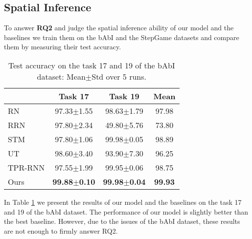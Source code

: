 \documentclass[letterpaper]{article} \usepackage{aaai22}  \usepackage{times}  \usepackage{helvet}  \usepackage{courier}  \usepackage[hyphens]{url}  \usepackage{graphicx} \urlstyle{rm} \def\UrlFont{\rm}  \usepackage{natbib}  \usepackage{caption} \DeclareCaptionStyle{ruled}{labelfont=normalfont,labelsep=colon,strut=off} \frenchspacing  \setlength{\pdfpagewidth}{8.5in}  \setlength{\pdfpageheight}{11in}  \usepackage{algorithm}
\begin{document}
\subsection{Spatial Inference}
\label{sec:spatial_inference}

To answer \textbf{RQ2} and judge the spatial inference ability of our model and the baselines we train them on the bAbI and the StepGame datasets and compare them by measuring their test accuracy.

\begin{table}[!t]
\centering
\small
\begin{adjustbox}{max width=\textwidth}
\begin{tabular}{p{2.3cm}|cc|c}
\hline
\hline
\multicolumn{1}{c|}{} & Task 17 & Task 19 & Mean \\ \hline
RN    & 97.33$\pm$1.55 & 98.63$\pm$1.79 & 97.98 \\
RRN & 97.80$\pm$2.34 & 49.80$\pm$5.76 & 73.80 \\
STM & 97.80$\pm$1.06 & 99.98$\pm$0.05 & 98.89 \\
UT & 98.60$\pm$3.40 & 93.90$\pm$7.30 & 96.25 \\ 
TPR-RNN & 97.55$\pm$1.99 & 99.95$\pm$0.06 & 98.75 \\
\hline
Ours & \textbf{99.88$\pm$0.10} & \textbf{99.98$\pm$0.04} & \textbf{99.93} \\ \hline
\hline
\end{tabular}
\end{adjustbox}
\caption{Test accuracy on the task 17 and 19 of the bAbI dataset: Mean$\pm$Std over 5 runs.}
\label{tbl:babi_17_19}
\end{table} 
 
In Table \ref{tbl:babi_17_19} we present the results of our model and the baselines on the task 17 and 19 of the bAbI dataset. 
The performance of our model is slightly better than the best baseline. However, due to the issues of the bAbI dataset, these results are not enough to firmly answer RQ2. 
\end{document}
